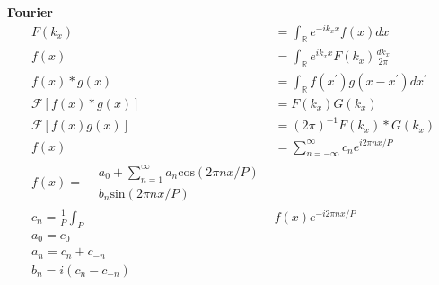 \documentclass[12pt]{article}
\begin{document}
\begin{multicols}{2}

\textbf{Fourier}
\begin{align}
  F(k_x) &= \int_{\mathbb{R}} e^{-ik_xx} f(x) dx\\
  f(x) &= \int_{\mathbb{R}} e^{ik_xx} F(k_x) \frac{dk_x}{2\pi}\\
  f(x) * g(x) &= \int_{\mathbb{R}} f(x^{\prime}) g(x - x^{\prime}) dx^{\prime}\\
  \mathcal{F}[f(x) * g(x)] &= F(k_x) G(k_x)\\
  \mathcal{F}[f(x)g(x)] &= (2\pi)^{-1} F(k_x) * G(k_x)\\
  f(x) &= \sum_{n = -\infty}^{\infty} c_n e^{i2\pi n x / P}\\
  f(x) = \begin{split}
    &a_0 + \sum_{n = 1}^{\infty} a_n \textrm{cos}(2\pi n x / P)\\
    & b_n \textrm{sin}(2\pi n x / P)
  \end{split}\\
  c_n = \frac{1}{P} \int_{P} &f(x) e^{-i2\pi n x / P}\\
  a_0 = c_0\\
  a_n = c_n + c_{-n}\\
  b_n = i (c_n - c_{-n})
\end{align}


\end{multicols}
\end{document}
